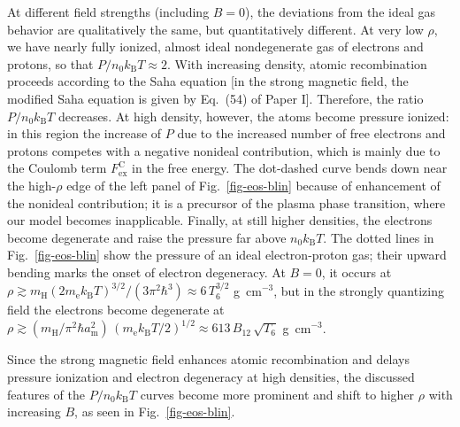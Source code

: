 \documentclass{emulateapj}
\newcommand{\gcc}{\mbox{g cm$^{-3}$}}
\newcommand{\mel}{m_\mathrm{e}}
\newcommand{\mH}{m_\mathrm{H}}
\newcommand{\am}{a_\mathrm{m}}
\newcommand{\kB}{k_\mathrm{B}}
\begin{document}
At different field strengths (including $B=0$), the deviations from 
the ideal gas behavior are qualitatively the same,
but quantitatively different. At very low $\rho$,
we have nearly fully ionized, almost ideal nondegenerate
gas of electrons
and protons, so that $P/n_0\kB T \approx2$. With increasing density,
atomic recombination proceeds according to the Saha 
equation [in the strong magnetic field, the modified Saha equation is given by
Eq.\ (54) of Paper I]. Therefore, the ratio $P/n_0\kB T$
 decreases. At high density,
however, the atoms become pressure ionized: in this region
the increase of $P$ due to the increased number of free electrons and
protons competes with a negative nonideal contribution,
which is mainly due to the Coulomb term $F_\mathrm{ex}^\mathrm{C}$ 
in the free energy. 
The dot-dashed curve bends down near the high-$\rho$ edge
of the left panel of Fig.\ \ref{fig-eos-blin} because of 
enhancement of the nonideal contribution; it is a precursor
of the plasma phase transition, where our model becomes inapplicable.
Finally, at still higher densities,
the electrons become degenerate and raise the pressure
far above $n_0\kB T$.
The dotted lines in Fig.\ \ref{fig-eos-blin}
show the pressure of an ideal electron-proton gas;
their upward bending marks the onset of electron degeneracy.
At $B=0$, it occurs at 
$\rho\gtrsim \mH(2\mel\kB T)^{3/2}/(3\pi^2\hbar^3)
\approx 6\,T_6^{3/2}$ \gcc,
but in the strongly quantizing field the electrons become degenerate
at $\rho\gtrsim (\mH/\pi^2\hbar\am^2)\, (\mel\kB T/2)^{1/2}
\approx 613\,B_{12}\,\sqrt{T_6}$ \gcc.

Since the strong magnetic field enhances
atomic recombination and delays pressure ionization 
 and electron degeneracy
at high densities, the discussed features of 
the $P/n_0\kB T$ curves
become more prominent and shift to higher $\rho$
with increasing $B$, as seen in Fig.\ \ref{fig-eos-blin}.
\end{document}
